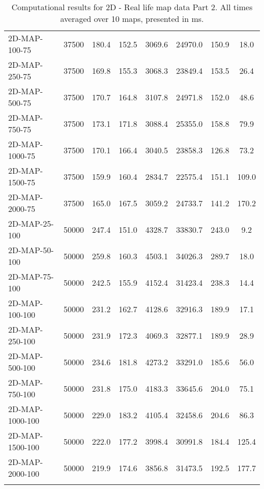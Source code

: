 \documentclass{article}
\begin{document}
\begin{center}
\begin{table}[h]
\begin{tabular}{|l||c|c|c|c|c|c|c|}
            2D-MAP-100-75                  & 37500 & 180.4     & 152.5      & 3069.6      & 24970.0  & 150.9     & 18.0       \\
            2D-MAP-250-75                  & 37500 & 169.8     & 155.3      & 3068.3      & 23849.4  & 153.5     & 26.4       \\
            2D-MAP-500-75                  & 37500 & 170.7     & 164.8      & 3107.8      & 24971.8  & 152.0     & 48.6       \\
            2D-MAP-750-75                  & 37500 & 173.1     & 171.8      & 3088.4      & 25355.0  & 158.8     & 79.9       \\
            2D-MAP-1000-75                 & 37500 & 170.1     & 166.4      & 3040.5      & 23858.3  & 126.8     & 73.2       \\
            2D-MAP-1500-75                 & 37500 & 159.9     & 160.4      & 2834.7      & 22575.4  & 151.1     & 109.0      \\
            2D-MAP-2000-75                 & 37500 & 165.0     & 167.5      & 3059.2      & 24733.7  & 141.2     & 170.2      \\
            \hline
            2D-MAP-25-100                  & 50000 & 247.4     & 151.0      & 4328.7      & 33830.7  & 243.0     & 9.2        \\
            2D-MAP-50-100                  & 50000 & 259.8     & 160.3      & 4503.1      & 34026.3  & 289.7     & 18.0       \\
            2D-MAP-75-100                  & 50000 & 242.5     & 155.9      & 4152.4      & 31423.4  & 238.3     & 14.4       \\
            2D-MAP-100-100                 & 50000 & 231.2     & 162.7      & 4128.6      & 32916.3  & 189.9     & 17.1       \\
            2D-MAP-250-100                 & 50000 & 231.9     & 172.3      & 4069.3      & 32877.1  & 189.9     & 28.9       \\
            2D-MAP-500-100                 & 50000 & 234.6     & 181.8      & 4273.2      & 33291.0  & 185.6     & 56.0       \\
            2D-MAP-750-100                 & 50000 & 231.8     & 175.0      & 4183.3      & 33645.6  & 204.0     & 75.1       \\
            2D-MAP-1000-100                & 50000 & 229.0     & 183.2      & 4105.4      & 32458.6  & 204.6     & 86.3       \\
            2D-MAP-1500-100                & 50000 & 222.0     & 177.2      & 3998.4      & 30991.8  & 184.4     & 125.4      \\
            2D-MAP-2000-100                & 50000 & 219.9     & 174.6      & 3856.8      & 31473.5  & 192.5     & 177.7      \\
            \hline
            \caption{Computational results for 2D - Real life map data Part 2. All times averaged over 10 maps, presented in ms.}
        \end{tabular}
    \end{table}
\end{center}
\end{document}

